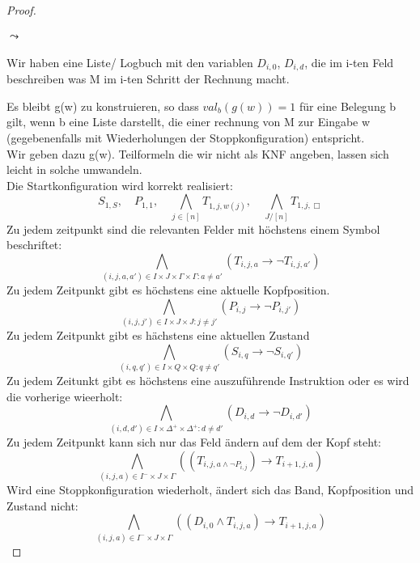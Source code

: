 \begin{proof}
        \paragraph*{\(\leadsto\)}
            Wir haben eine Liste/ Logbuch mit den variablen \(D_{i, 0}\), \(D_{i, d}\), die im i-ten Feld beschreiben was M im i-ten Schritt der Rechnung macht.
        
        Es bleibt g(w) zu konstruieren, so dass \(val_b(g(w)) = 1\) für eine Belegung b gilt, wenn b eine Liste darstellt, die einer rechnung von M zur Eingabe w (gegebenenfalls mit Wiederholungen der Stoppkonfiguration) entspricht.
        \vspace*{0.5cm}
        \\
        Wir geben dazu g(w). Teilformeln die wir nicht als KNF angeben, lassen sich leicht in solche umwandeln. 
        \vspace*{0.5cm}
        \\
        Die Startkonfiguration wird korrekt realisiert:
        \[
            S_{1,S}, \quad P_{1, 1}, \quad \bigwedge \limits_{j\in [n]} T_{1,j, w(j)},\quad \bigwedge \limits_{J/[n]} T_{1, j, \Box}   
        \]
        Zu jedem zeitpunkt sind die relevanten Felder mit höchstens einem Symbol beschriftet:
        \[
            \bigwedge \limits_{(i, j, a, a') \in I \times J \times \Gamma \times \Gamma : a \not = a'} (T_{i, j, a} \to \lnot T_{i, j, a'})
        \]
        Zu jedem Zeitpunkt gibt es höchstens eine aktuelle Kopfposition.
        \[
            \bigwedge \limits_{(i, j, j') \in I \times J \times J : j \not = j'} (P_{i, j} \to \lnot P_{i, j'})      
        \]
        Zu jedem Zeitpunkt gibt es hächstens eine aktuellen Zustand
        \[
            \bigwedge \limits_{(i, q, q') \in I \times Q \times Q : q \not = q'} (S_{i, q} \to \lnot S_{i, q'})      
        \]
        Zu jedem Zeitunkt gibt es höchstens eine auszuführende Instruktion oder es wird die vorherige wieerholt:
        \[
            \bigwedge \limits_{(i, d, d') \in I \times \Delta^+ \times \Delta^+ : d \not = d'} (D_{i, d} \to \lnot D_{i, d'})      
        \]
        Zu jedem Zeitpunkt kann sich nur das Feld ändern auf dem der Kopf steht: 
        \[
            \bigwedge \limits_{(i, j, a) \in I^- \times J \times \Gamma} ((T_{i, j, a \wedge \lnot P_{i, j}}) \to T_{i+1, j, a})      
        \]
        Wird eine Stoppkonfiguration wiederholt, ändert sich das Band, Kopfposition und Zustand nicht:
        \[
            \bigwedge \limits_{(i, j, a) \in I^- \times J \times \Gamma} ((D_{i,0} \wedge T_{i, j, a}) \to T_{i+ 1, j, a} )
\]
\end{proof}
